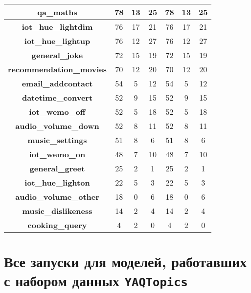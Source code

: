 \begin{table}[]
{\begin{tabular}{|c||c|c|c|c|c|c|}
  \textbf{qa\_maths}& 78 & 13 & 25 & 78 & 13 & 25\\ \hline
  \textbf{iot\_hue\_lightdim}& 76 & 17 & 21 & 76 & 17 & 21\\ \hline
  \textbf{iot\_hue\_lightup}& 76 & 12 & 27 & 76 & 12 & 27\\ \hline
  \textbf{general\_joke}& 72 & 15 & 19 & 72 & 15 & 19\\ \hline
  \textbf{recommendation\_movies}& 70 & 12 & 20 & 70 & 12 & 20\\ \hline
  \textbf{email\_addcontact}& 54 & 5 & 12 & 54 & 5 & 12\\ \hline
  \textbf{datetime\_convert}& 52 & 9 & 15 & 52 & 9 & 15\\ \hline
  \textbf{iot\_wemo\_off}& 52 & 5 & 18 & 52 & 5 & 18\\ \hline
  \textbf{audio\_volume\_down}& 52 & 8 & 11 & 52 & 8 & 11\\ \hline
  \textbf{music\_settings}& 51 & 8 & 6 & 51 & 8 & 6\\ \hline
  \textbf{iot\_wemo\_on}& 48 & 7 & 10 & 48 & 7 & 10\\ \hline
  \textbf{general\_greet}& 25 & 2 & 1 & 25 & 2 & 1\\ \hline
  \textbf{iot\_hue\_lighton}& 22 & 5 & 3 & 22 & 5 & 3\\ \hline
  \textbf{audio\_volume\_other}& 18 & 0 & 6 & 18 & 0 & 6\\ \hline
  \textbf{music\_dislikeness}& 14 & 2 & 4 & 14 & 2 & 4\\ \hline
  \textbf{cooking\_query}& 4 & 2 & 0 & 4 & 2 & 0\\ \hline 
\end{tabular}
}
\end{table}

\section{Все запуски для моделей, работавших с набором данных \texttt{YAQTopics}}

